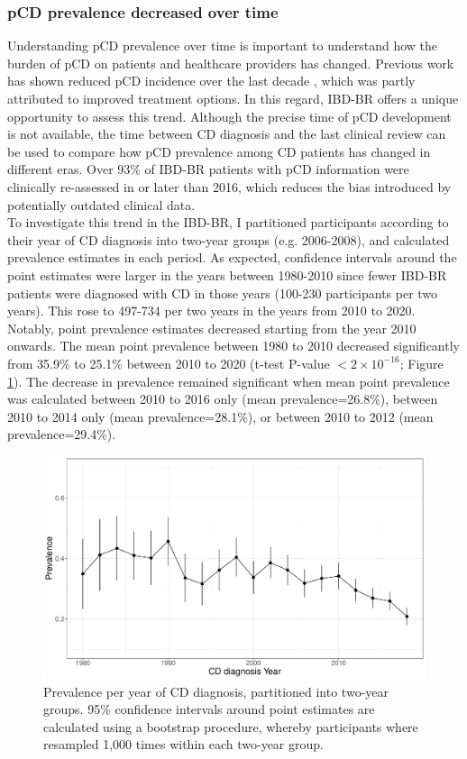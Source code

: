     \subsubsection{pCD prevalence decreased over time}
    Understanding pCD prevalence over time is important to understand how the burden of pCD on patients and healthcare providers has changed. Previous work has shown reduced pCD incidence over the last decade \cite{Park2019-kj}, which was partly attributed to improved treatment options. In this regard, IBD-BR offers a unique opportunity to assess this trend. Although the precise time of pCD development is not available, the time between CD diagnosis and the last clinical review can be used to compare how pCD prevalence among CD patients has changed in different eras. Over 93\% of IBD-BR patients with pCD information were clinically re-assessed in or later than 2016, which reduces the bias introduced by potentially outdated clinical data. \\
    
    To investigate this trend in the IBD-BR, I partitioned participants according to their year of CD diagnosis into two-year groups (e.g. 2006-2008), and calculated prevalence estimates in each period. As expected, confidence intervals around the point estimates were larger in the years between 1980-2010 since fewer IBD-BR patients were diagnosed with CD in those years (100-230 participants per two years). This rose to 497-734 per two years in the years from 2010 to 2020.  Notably, point prevalence estimates decreased starting from the year 2010 onwards. The mean point prevalence between 1980 to 2010 decreased significantly from 35.9\% to 25.1\% between 2010 to 2020 (t-test P-value $<2\times10^{-16}$; Figure \ref{fig:pcd_prev}). The decrease in prevalence remained significant when mean point prevalence was calculated between 2010 to 2016 only (mean prevalence=26.8\%), between 2010 to 2014 only (mean prevalence=28.1\%), or between 2010 to 2012 (mean prevalence=29.4\%).\\
    \begin{figure}[htb] 
      \centering    
      \includegraphics[width=1.0\textwidth]{fig2}
      \caption[pCD prevalence temporal trend from 1980 till 2020]{Prevalence per year of CD diagnosis, partitioned into two-year groups. 95\% confidence intervals around point estimates are calculated using a bootstrap procedure, whereby participants where resampled 1,000 times within each two-year group.}
      \label{fig:pcd_prev}
      \end{figure}
 
